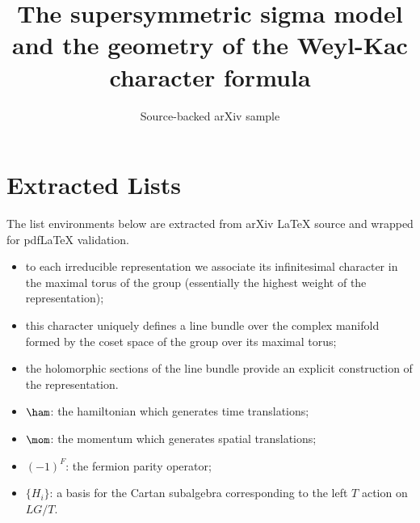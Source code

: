 \documentclass[11pt]{article}
\title{The supersymmetric sigma model and the geometry of the Weyl-Kac
  character formula}
\author{Source-backed arXiv sample}
\date{}
\begin{document}
\maketitle
\section{Extracted Lists}

The list environments below are extracted from arXiv LaTeX source and wrapped for pdfLaTeX validation.

\begin{itemize}
\item to each irreducible representation we associate its infinitesimal
character in the maximal torus of the group (essentially the
highest weight of the representation);
\item this character uniquely defines a line bundle over the complex
manifold formed by the coset space of the group over its maximal torus;
\item the holomorphic sections of the line bundle
 provide an explicit construction of the representation.
\end{itemize}

\begin{itemize}
\item $\ham$: the hamiltonian which generates time translations;
\item $\mom$: the momentum which generates spatial translations;
\item $(-1)^F$: the fermion parity operator;
\item $\{H_i\}$: a basis for the Cartan subalgebra corresponding to
the left $T$ action on $LG/T$.
\end{itemize}
\end{document}

